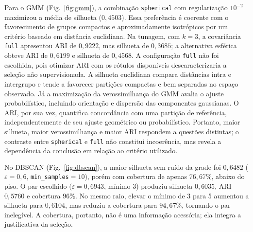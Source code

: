 \documentclass[conference,a4paper]{IEEEtran}
\begin{document}
Para o GMM (Fig.~\ref{fig:gmm}), a combinação \texttt{spherical} com regularização $10^{-2}$ maximizou a média de silhueta ($0{,}4503$). Essa preferência é coerente com o favorecimento de grupos compactos e aproximadamente isotrópicos por um critério baseado em distância euclidiana. Na tunagem, com $k=3$, a covariância \texttt{full} apresentou ARI de $0{,}9222$, mas silhueta de $0{,}3685$; a alternativa esférica obteve ARI de $0{,}6199$ e silhueta de $0{,}4568$. A configuração \texttt{full} não foi escolhida, pois otimizar ARI com os rótulos disponíveis descaracterizaria a seleção não supervisionada. A silhueta euclidiana compara distâncias intra e intergrupo e tende a favorecer partições compactas e bem separadas no espaço observado. Já a maximização da verossimilhança do GMM avalia o ajuste probabilístico, incluindo orientação e dispersão das componentes gaussianas. O ARI, por sua vez, quantifica concordância com uma partição de referência, independentemente de seu ajuste geométrico ou probabilístico. Portanto, maior silhueta, maior verossimilhança e maior ARI respondem a questões distintas; o contraste entre \texttt{spherical} e \texttt{full} não constitui incoerência, mas revela a dependência da conclusão em relação ao critério utilizado.

No DBSCAN (Fig.~\ref{fig:dbscan}), a maior silhueta sem ruído da grade foi $0{,}6482$ ($\varepsilon=0{,}6$, \texttt{min\_samples}$=10$), porém com cobertura de apenas $76{,}67\%$, abaixo do piso. O par escolhido ($\varepsilon=0{,}6943$, mínimo 3) produziu silhueta $0{,}6035$, ARI $0{,}5760$ e cobertura $96\%$. No mesmo raio, elevar o mínimo de 3 para 5 aumentou a silhueta para $0{,}6104$, mas reduziu a cobertura para $94{,}67\%$, tornando o par inelegível. A cobertura, portanto, não é uma informação acessória; ela integra a justificativa da seleção.
\end{document}
